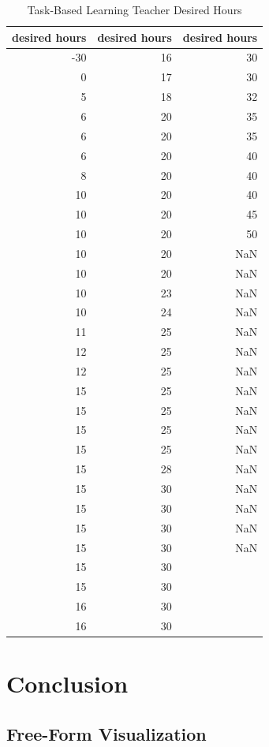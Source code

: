 \documentclass[oneside]{article}
\begin{document}
\begin{table}[]
  \caption{Task-Based Learning Teacher Desired Hours}
  \centering
  \label{tab:teacher_desired_hours}
  \begin{tabular}{rrr}
    \toprule
    \textbf{desired hours} & \textbf{desired hours} & \textbf{desired hours} \\
    \midrule
    \hline
    -30 & 16 & 30 \\
    0   & 17 & 30 \\
    5   & 18 & 32 \\
    6   & 20 & 35 \\
    6   & 20 & 35 \\
    6   & 20 & 40 \\
    8   & 20 & 40 \\
    10  & 20 & 40 \\
    10  & 20 & 45 \\
    10  & 20 & 50 \\
    10  & 20 & NaN\\
    10  & 20 & NaN\\
    10  & 23 & NaN\\
    10  & 24 & NaN\\
    11  & 25 & NaN\\
    12  & 25 & NaN\\
    12  & 25 & NaN\\
    15  & 25 & NaN\\
    15  & 25 & NaN\\
    15  & 25 & NaN\\
    15  & 25 & NaN\\
    15  & 28 & NaN\\
    15  & 30 & NaN\\
    15  & 30 & NaN\\
    15  & 30 & NaN\\
    15  & 30 & NaN\\
    15  & 30\\
    15  & 30\\
    16  & 30\\
    16  & 30\\
    \hline
    \bottomrule
  \end{tabular}
\end{table}



\section{Conclusion}
\subsection{Free-Form Visualization}
\end{document}
